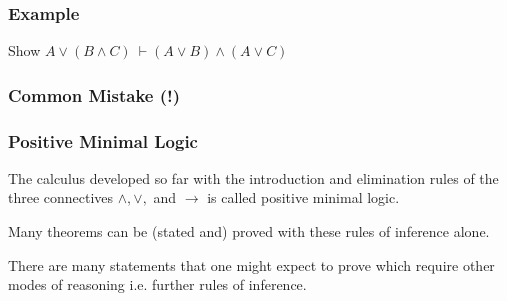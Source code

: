 \documentclass{beamer}
\begin{document}
\begin{frame}
  \frametitle{Example}

	Show $A \lor (B \land C) \ \vdash (A \lor B) \land (A \lor C)$
	
	\vspace{7cm}



\end{frame}

\begin{frame}
	\frametitle{Common Mistake (!)}



\end{frame}

\begin{frame}
  \frametitle{Positive Minimal Logic}

    The calculus developed so far with the introduction and elimination rules of the three connectives $\land, \lor,$ and $\to$ is called positive minimal logic. 

    \vspace{0.5cm}

    Many theorems can be (stated and) proved with these rules of inference alone. 

    \vspace{0.5cm}

    There are many statements that one might expect to prove which require other modes of reasoning i.e. further rules of inference.  

\end{frame}
\end{document}

